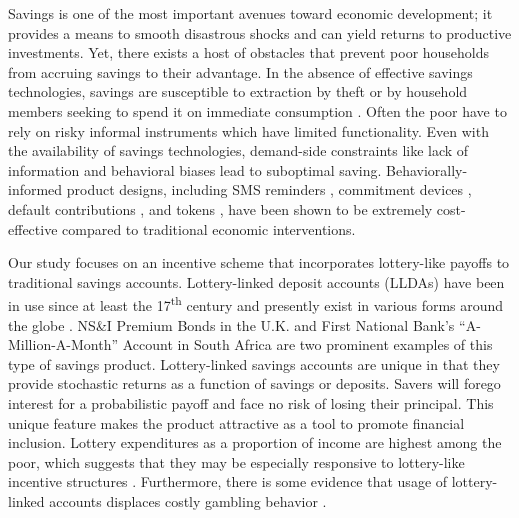 \documentclass[11pt]{article}
\begin{document}
	Savings is one of the most important avenues toward economic development; it provides a means to smooth disastrous shocks and can yield returns to productive investments. Yet, there exists a host of obstacles that prevent poor households from accruing savings to their advantage. In the absence of effective savings technologies, savings are susceptible to extraction by theft or by household members seeking to spend it on immediate consumption . Often the poor have to rely on risky informal instruments which have limited functionality. Even with the availability of savings technologies, demand-side constraints like lack of information and behavioral biases lead to suboptimal saving. Behaviorally-informed product designs, including SMS reminders , commitment devices , default contributions , and tokens , have been shown to be extremely cost-effective compared to traditional economic interventions.


	Our study focuses on an incentive scheme that incorporates lottery-like payoffs to traditional savings accounts. Lottery-linked deposit accounts (LLDAs) have been in use since at least the 17\textsuperscript{th} century and presently exist in various forms around the globe . NS\&I Premium Bonds in the U.K. and First National Bank's ``A-Million-A-Month'' Account in South Africa are two prominent examples of this type of savings product. Lottery-linked savings accounts are unique in that they provide stochastic returns as a function of savings or deposits. Savers will forego interest for a probabilistic payoff and face no risk of losing their principal. This unique feature makes the product attractive as a tool to promote financial inclusion. Lottery expenditures as a proportion of income are highest among the poor, which suggests that they may be especially responsive to lottery-like incentive structures . Furthermore, there is some evidence that usage of lottery-linked accounts displaces costly gambling behavior .
\end{document}
